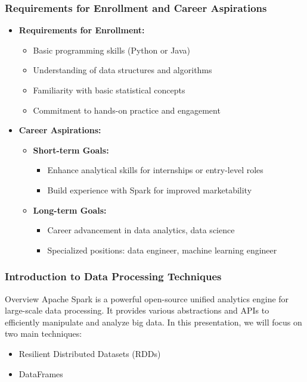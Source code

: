 \documentclass[aspectratio=169]{beamer}
\begin{document}
\begin{frame}[fragile]
    \frametitle{Requirements for Enrollment and Career Aspirations}
    \begin{itemize}
        \item \textbf{Requirements for Enrollment:}
            \begin{itemize}
                \item Basic programming skills (Python or Java)
                \item Understanding of data structures and algorithms
                \item Familiarity with basic statistical concepts
                \item Commitment to hands-on practice and engagement
            \end{itemize}
        \item \textbf{Career Aspirations:}
            \begin{itemize}
                \item \textbf{Short-term Goals:}
                    \begin{itemize}
                        \item Enhance analytical skills for internships or entry-level roles
                        \item Build experience with Spark for improved marketability
                    \end{itemize}
                \item \textbf{Long-term Goals:}
                    \begin{itemize}
                        \item Career advancement in data analytics, data science
                        \item Specialized positions: data engineer, machine learning engineer
                    \end{itemize}
            \end{itemize}
    \end{itemize}
\end{frame}

\begin{frame}[fragile]
    \frametitle{Introduction to Data Processing Techniques}
    \begin{block}{Overview}
        Apache Spark is a powerful open-source unified analytics engine for large-scale data processing. It provides various abstractions and APIs to efficiently manipulate and analyze big data. 
        In this presentation, we will focus on two main techniques: 
        \begin{itemize}
            \item Resilient Distributed Datasets (RDDs)
            \item DataFrames
        \end{itemize}
    \end{block}
\end{frame}
\end{document}
